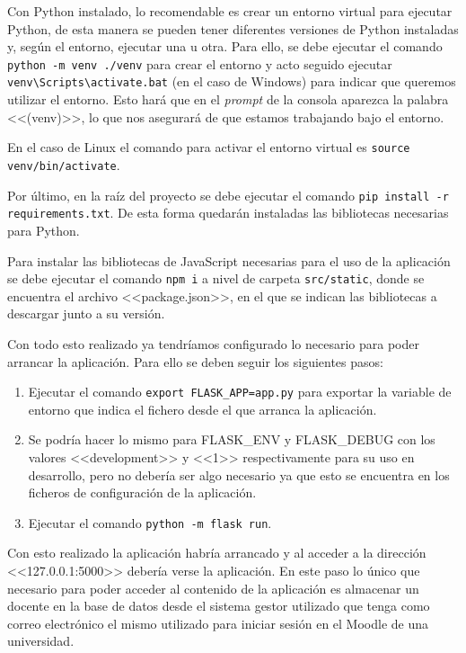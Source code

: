 Con Python instalado, lo recomendable es crear un entorno virtual para ejecutar Python, de esta manera se pueden tener diferentes versiones de Python instaladas y, según el entorno, ejecutar una u otra.
Para ello, se debe ejecutar el comando \texttt{python -m venv ./venv} para crear el entorno y acto seguido ejecutar \texttt{venv\textbackslash{}Scripts\textbackslash{}activate.bat} (en el caso de Windows) para indicar que queremos utilizar el entorno.
Esto hará que en el \textit{prompt} de la consola aparezca la palabra <<(venv)>>, lo que nos asegurará de que estamos trabajando bajo el entorno.

En el caso de Linux el comando para activar el entorno virtual es \texttt{source venv/bin/activate}.

Por último, en la raíz del proyecto se debe ejecutar el comando \texttt{pip install -r requirements.txt}.
De esta forma quedarán instaladas las bibliotecas necesarias para Python.

Para instalar las bibliotecas de JavaScript necesarias para el uso de la aplicación se debe ejecutar el comando \texttt{npm i} a nivel de carpeta \texttt{src/static}, donde se encuentra el archivo <<package.json>>, en el que se indican las bibliotecas a descargar junto a su versión. 

Con todo esto realizado ya tendríamos configurado lo necesario para poder arrancar la aplicación.
Para ello se deben seguir los siguientes pasos:
\begin{enumerate}
\item Ejecutar el comando \texttt{export FLASK\_APP=app.py} para exportar la variable de entorno que indica el fichero desde el que arranca la aplicación.
\item Se podría hacer lo mismo para FLASK\_ENV y FLASK\_DEBUG con los valores <<development>> y <<1>> respectivamente para su uso en desarrollo, pero no debería ser algo necesario ya que esto se encuentra en los ficheros de configuración de la aplicación.
\item Ejecutar el comando \texttt{python -m flask run}.
\end{enumerate}

Con esto realizado la aplicación habría arrancado y al acceder a la dirección <<127.0.0.1:5000>> debería verse la aplicación.
En este paso lo único que necesario para poder acceder al contenido de la aplicación es almacenar un docente en la base de datos desde el sistema gestor utilizado que tenga como correo electrónico el mismo utilizado para iniciar sesión en el Moodle de una universidad.

